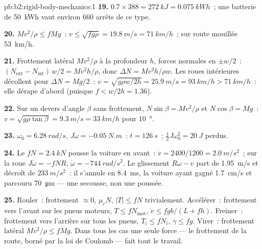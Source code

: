 \begin{solution}{pb:b2:rigid-body-mechanics:1}
\textbf{19.} $0.7 \times 388 = \qty{272}{kJ} = \qty{0.075}{kWh}$~; une batterie de \qty{50}{kWh}
vaut environ $660$ arrêts de ce type.

\textbf{20.} $Mv^2/\rho \le fMg$~: $v \le \sqrt{fg\rho} = \qty{19.8}{m/s} =
\qty{71}{km/h}$~; sur route mouillée \qty{53}{km/h}.

\textbf{21.} Frottement latéral $Mv^2/\rho$ à la profondeur $h$, forces normales en
$\pm w/2$~: $(N_{\text{ext}} - N_{\text{int}})\,w/2 = Mv^2h/\rho$, donc $\Delta N =
Mv^2h/\rho w$. Les roues intérieures décollent pour $\Delta N = Mg/2$~: $v = \sqrt{g\rho w/2h} =
\qty{25.9}{m/s} = \qty{93}{km/h} > \qty{71}{km/h}$~: elle dérape d'abord (puisque $f <
w/2h = 1.36$).

\textbf{22.} Sur un devers d'angle $\beta$ sans frottement, $N\sin\beta =
Mv^2/\rho$ et $N\cos\beta = Mg$~: $v = \sqrt{g\rho\tan\beta} = \qty{9.3}{m/s} =
\qty{33}{km/h}$ pour \qty{10}{\degree}.

\textbf{23.} $\omega_0 = \qty{6.28}{rad/s}$, $J\dot\omega = \qty{-0.05}{N.m}$~: $t =
\qty{126}{s}$~; $\tfrac12J\omega_0^2 = \qty{20}{J}$ perdus.

\textbf{24.} Le  $fN = \qty{2.4}{kN}$ pousse la voiture en avant~:
$\dot v = 2400/1200 = \qty{2.0}{m/s^2}$~; sur la roue $J\dot\omega = -fNR$,
$\dot\omega = \qty{-744}{rad/s^2}$. Le glissement $R\omega - v$ part de \qty{1.95}{m/s}
et décroît de $\qty{233}{m/s^2}$~: il s'annule en \qty{8.4}{ms}, la voiture ayant
gagné \qty{1.7}{cm/s} et parcouru \qty{70}{\micro m} --- une secousse, non une poussée.

\textbf{25.} Rouler~: frottement $\approx 0$,  $\mu_rN$,
$|T| \le fN$ trivialement. Accélérer~: frottement vers l'avant sur les pneus
moteurs, $T \le fN_{\text{mot}}$, $\dot v \le fgb/(L + fh)$. Freiner~:
frottement vers l'arrière sur tous les pneus, $T_i \le fN_i$, $\gamma \le fg$.
Virer~: frottement latéral $Mv^2/\rho \le fMg$. Dans tous les cas une seule
force --- le frottement de la route, borné par la loi de Coulomb --- fait
tout le travail.
\end{solution}
